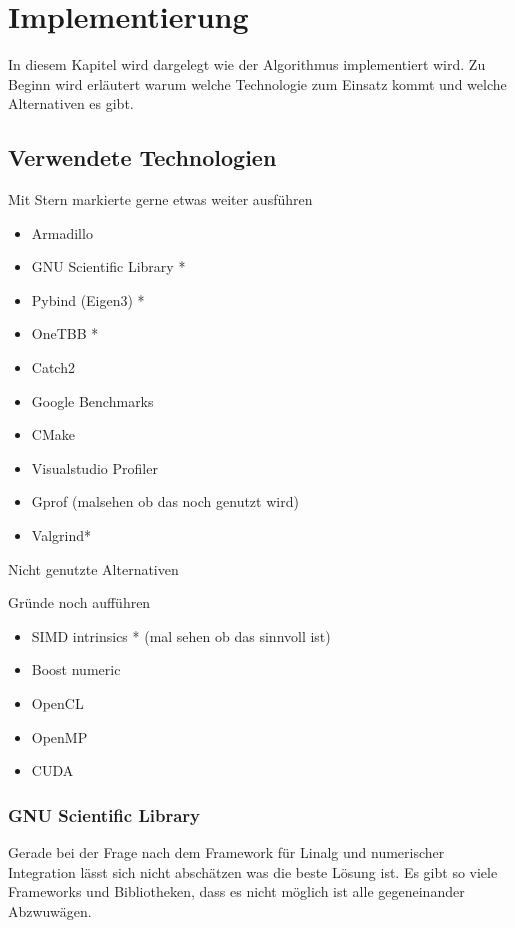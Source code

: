 \chapter{Implementierung}

In diesem Kapitel wird dargelegt wie der Algorithmus implementiert wird. Zu Beginn wird erläutert warum welche Technologie zum Einsatz kommt und welche Alternativen es gibt.
\section{Verwendete Technologien}


Mit Stern markierte gerne etwas weiter ausführen
\begin{itemize}
    \item Armadillo
    \item GNU Scientific Library *
    \item Pybind (Eigen3) *
    \item OneTBB *
    \item Catch2
    \item Google Benchmarks
    \item CMake
    \item Visualstudio Profiler
    \item Gprof (malsehen ob das noch genutzt wird)
    \item Valgrind*
\end{itemize}



Nicht genutzte Alternativen

Gründe noch aufführen
\begin{itemize}
    \item SIMD intrinsics * (mal sehen ob das sinnvoll ist)
    \item Boost numeric
    \item OpenCL
    \item OpenMP
    \item CUDA
\end{itemize}

\subsection{GNU Scientific Library}

Gerade bei der Frage nach dem Framework für Linalg und numerischer Integration lässt sich nicht abschätzen was die beste Lösung ist. Es gibt
so viele Frameworks und Bibliotheken, dass es nicht möglich ist alle gegeneinander Abzwuwägen.

